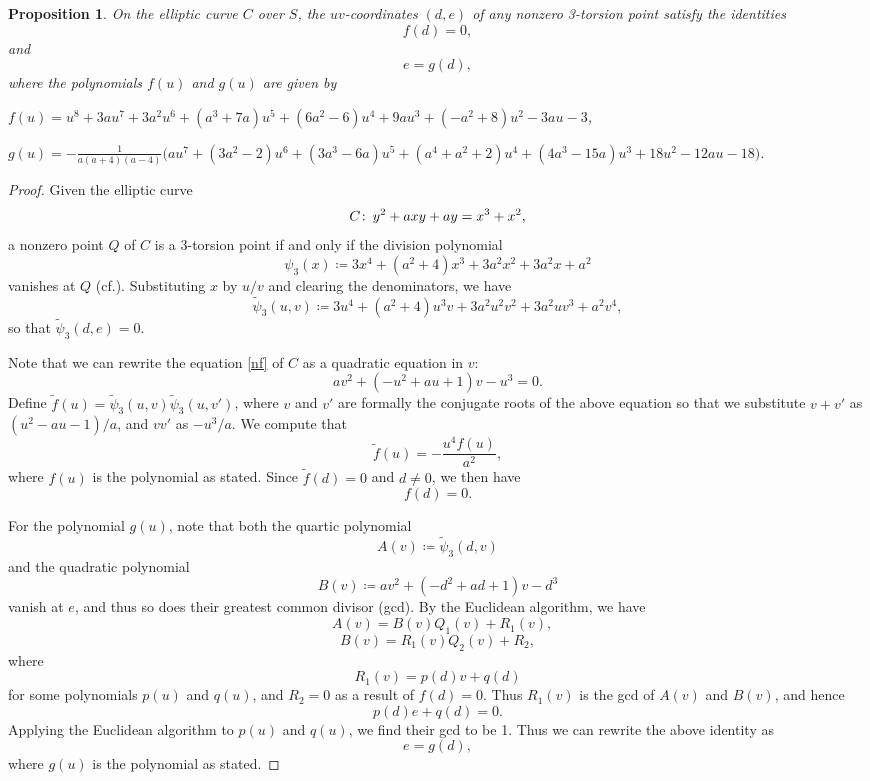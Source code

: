 \documentclass{gtpart}
\newtheorem{prop}[thm]{Proposition}
\theoremstyle{definition}
\theoremstyle{remark}
\def\co{\colon\thinspace}
\newcommand{\cff}[2]{cf.\thinspace{\cite[#1]{#2}}}
\newcommand{\Tf}{\widetilde{f}}
\newcommand{\TP}{\widetilde{\psi}}
\begin{document}
\begin{prop}
\label{prop:tors}
 On the elliptic curve $C$ over $S$, the $uv$-coordinates $(d,e)$ of any nonzero 3-torsion point satisfy the identities 
 \[
  f(d) = 0, 
 \]
 and 
 \[
  e = g(d), 
 \]
 where the polynomials $f(u)$ and $g(u)$ are given by 

 $f(u) = u^8 + 3 a u^7 + 3 a^2 u^6 + (a^3 + 7 a) u^5 + (6 a^2 - 6) u^4 + 9 a u^3 + (-a^2 + 8) u^2 - 3 a u - 3$, 

 $g(u) = -\frac{1}{a (a + 4) (a - 4)} \big(a u^7 + (3 a^2 - 2) u^6 + (3 a^3 - 6 a) u^5 + (a^4 + a^2 + 2) u^4 + (4 a^3 - 15 a) u^3 + 18 u^2 - 12 a u - 18\big)$.  
\end{prop}
\begin{proof}
 Given the elliptic curve 
 \[
  C \co y^2 + a x y + a y = x^3 + x^2, 
 \]
 a nonzero point $Q$ of $C$ is a 3-torsion point if and only if the division polynomial 
 \[
  \psi_3 (x) \coloneqq 3x^4 + (a^2 + 4) x^3 + 3a^2 x^2 + 3a^2 x + a^2 
 \]
 vanishes at $Q$ (\cff{exercise 3.7d}{AEC}).  Substituting $x$ by $u/v$ and clearing the denominators, we have 
 \[
  \TP_3(u,v) \coloneqq 3u^4 + (a^2 + 4) u^3 v + 3a^2 u^2 v^2 + 3a^2 u v^3 + a^2 v^4, 
 \]
 so that $\TP_3(d,e) = 0$.  

 Note that we can rewrite the equation \eqref{nf} of $C$ as a quadratic equation in $v$: 
 \[
  a v^2 + (-u^2 + a u + 1) v - u^3 = 0.  
 \]
 Define $\Tf(u) = \TP_3(u,v) \TP_3(u,v')$, where $v$ and $v'$ are formally the conjugate roots of the 
 above equation so that we substitute $v + v'$ as $(u^2 - a u - 1) / a$, and $v v'$ as $-u^3 / a$.  We compute that 
 \[
  \Tf(u) = -\frac{u^4 f(u)}{a^2}, 
 \]
 where $f(u)$ is the polynomial as stated.  
 Since $\Tf(d) = 0$ and $d \neq 0$, we then have 
 \[
  f(d) = 0.  
 \]

 For the polynomial $g(u)$, note that both the quartic polynomial 
 \[
  A(v) \coloneqq \TP_3(d,v) 
 \]
 and the quadratic polynomial 
 \[
  B(v) \coloneqq a v^2 + (-d^2 + a d + 1) v - d^3
 \]
 vanish at $e$, and thus so does their greatest common divisor (gcd).  By the Euclidean algorithm, we have 
 \[
  ~~~A(v) = B(v)Q_1(v) + R_1(v), 
 \]
 \[
  B(v) = R_1(v)Q_2(v) + R_2, 
 \]
 where 
 \[
  R_1(v) = p(d) v + q(d)
 \]
 for some polynomials $p(u)$ and $q(u)$, and $R_2 = 0$ as a result of $f(d) = 0$.  Thus $R_1(v)$ is the gcd of $A(v)$ and $B(v)$, and hence 
 \[
  p(d) e + q(d) = 0.  
 \]
 Applying the Euclidean algorithm to $p(u)$ and $q(u)$, we find their gcd to be 1.  
 Thus we can rewrite the above identity as 
 \[
  e = g(d), 
 \]
 where $g(u)$ is the polynomial as stated.  
\end{proof}
\end{document}
